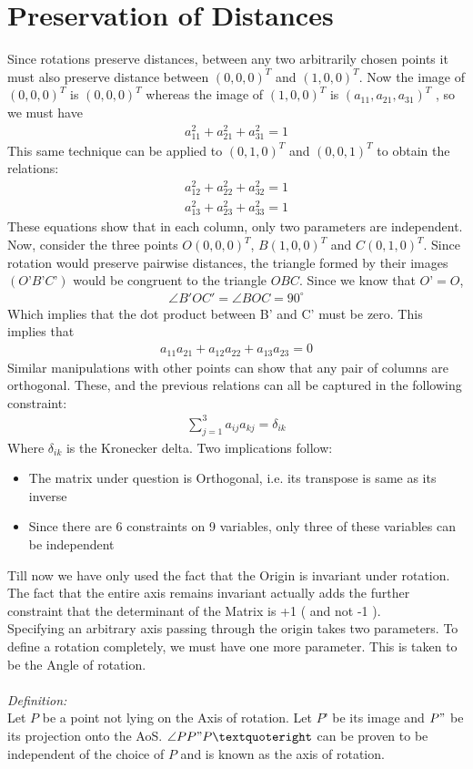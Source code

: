 \documentclass[
11pt, %
english, %
singlespacing, %
headsepline, %
]{MastersDoctoralThesis} %
\begin{document}
\section{Preservation of Distances}
Since rotations preserve distances, between any two arbitrarily chosen points it must also preserve distance between $(0,0,0)^T$  and $(1,0,0)^T$. Now the image of $(0,0,0)^T$ is $(0,0,0)^T$  whereas the image of $(1,0,0)^T$ is $(a_{11}, a_{21}, a_{31})^T$ , so we must have 
\begin{align*}
a_{11}^2+a_{21}^2+a_{31}^2=1
\end{align*}
This same technique can be applied to $(0,1,0)^T$ and $(0,0,1)^T$ to obtain the relations:
\begin{align*} a_{12}^2+a_{22}^2+a_{32}^2=1 \\ a_{13}^2+a_{23}^2+a_{33}^2=1 \end{align*}
These equations show that in each column, only two parameters are independent. \\
Now, consider the three points $O(0,0,0)^T$, $B(1,0,0)^T$  and $C(0,1,0)^T$. Since rotation would preserve pairwise distances, the triangle formed by their images $(O’B’C’)$ would be congruent to the triangle $OBC$. Since we know that $O’ = O$, 
\begin{align*} \angle B'OC'= \angle BOC = 90^{\circ} \end{align*}
Which implies that the dot product between B’ and C’ must be zero. This implies that
\begin{align*} a_{11} a_{21}+a_{12} a_{22}+a_{13} a{_23}=0\end{align*}
Similar manipulations with other points can show that any pair of columns are orthogonal. These, and the previous relations can all be captured in the following constraint:
\begin{align*} \sum_{j=1}^3 a_{ij}a_{kj} = \delta_{ik} \end{align*}
Where $\delta_{ik}$ is the Kronecker delta. Two implications follow:
\begin{itemize}
  \item The matrix under question is Orthogonal, i.e. its transpose is same as its inverse
  \item Since there are 6 constraints on 9 variables, only three of these variables can be independent
\end{itemize}
Till now we have only used the fact that the Origin is invariant under rotation. The fact that the entire axis remains invariant actually adds the further constraint that the determinant of the Matrix is +1 ( and not -1 ). \\
Specifying an arbitrary axis passing through the origin takes two parameters. To define a rotation completely, we must have one more parameter. This is taken to be the Angle of rotation.\\ \\
\emph{Definition:}\\
Let $P$ be a point not lying on the Axis of rotation. Let $P’$ be its image and $P"$ be its projection onto the AoS.  $\angle PP"P’$ can be proven to be independent of the choice of $P$ and is known as the axis of rotation.
\end{document}
